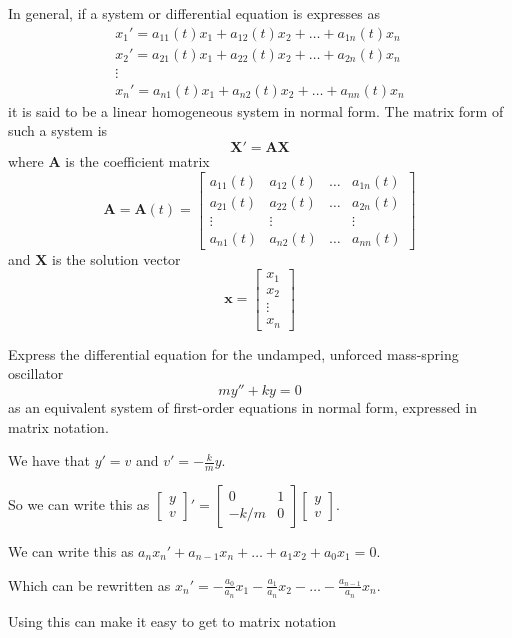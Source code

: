 \documentclass[../diffeq.tex]{subfiles}
\begin{document}
In general, if a system or differential equation is expresses as 
\begin{align*}
    x_1'=a_{11}(t)x_1+a_{12}(t)x_2+\dots + a_{1n}(t)x_n \\
    x_2'=a_{21}(t)x_1+a_{22}(t)x_2+\dots + a_{2n}(t)x_n\\
    \vdots \\
    x_n' = a_{n1}(t)x_1+a_{n2}(t)x_2+\dots + a_{nn}(t)x_n
\end{align*}
it is said to be a linear homogeneous system in normal form. The matrix form of such a system is 
\[ \textbf{X}'=\textbf{A}\textbf{X}\]
where $\textbf{A}$ is the coefficient matrix 
\[ \textbf{A}=\textbf{A}(t)=\begin{bmatrix}
    a_{11}(t) & a_{12}(t) & \dots & a_{1n}(t) \\
    a_{21}(t) & a_{22}(t) & \dots & a_{2n}(t) \\
    \vdots & \vdots & & \vdots \\
    a_{n1}(t) & a_{n2}(t) & \dots & a_{nn}(t)
\end{bmatrix}\]
and $\textbf{X}$ is the solution vector 
\[ \textbf{x}=\begin{bmatrix}
    x_1\\x_2\\ \vdots \\x_n
\end{bmatrix}\]

\begin{example}
    Express the differential equation for the undamped, unforced mass-spring oscillator 
    \[ my''+ky=0 \]
    as an equivalent system of first-order equations in normal form, expressed in matrix notation.

    We have that $y'=v$ and $v'=-\frac{k}{m}y$.

    So we can write this as $\begin{bmatrix}
        y\\v
    \end{bmatrix}'=\begin{bmatrix}
        0 & 1\\
        -k/m & 0 
    \end{bmatrix}
    \begin{bmatrix}
        y\\v
    \end{bmatrix}$.

    We can write this as $a_nx_n'+a_{n-1}x_n+\dots + a_1x_2+a_0x_1=0$.

    Which can be rewritten as $x_n'=-\frac{a_0}{a_n}x_1-\frac{a_1}{a_n}x_2-\dots -\frac{a_{n-1}}{a_n}x_n$.

    Using this can make it easy to get to matrix notation
\end{example}
\end{document}
